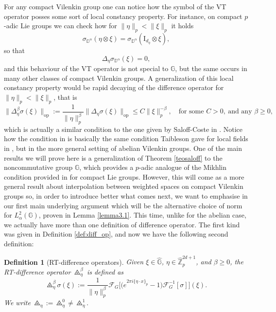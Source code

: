 \documentclass[12pt, reqno]{amsart}
\newtheorem{defi}{Definition}[section]
\newcommand{\1}{\mathds{1}}
\begin{document}
For any compact Vilenkin group one can notice how the symbol of the VT operator posses some sort of local constancy property. For instance, on compact $p$-adic Lie groups we can check how for $\|\eta\|_p < \|\xi\|_p$ it holds
\[
\sigma_{\mathbb{D}^\alpha} (\eta \otimes \xi) = \sigma_{\mathbb{D}^\alpha} ( \mathrm{I}_{d_\eta} \otimes \xi),
\]
so that
\[
\Delta_\eta \sigma_{\mathbb{D}^\alpha} (\xi) = 0,
\]
and this behaviour of the VT operator is not special to $\mathbb{G}$, but the same occurs in many other classes of compact Vilenkin groups. A generalization of this local constancy property would be rapid decaying of the difference operator for $\|\eta\|_p < \|\xi\|_p$, that is
\[
\|\Delta^\beta_\eta \sigma(\xi)\|_{\mathrm{op}} := \frac{1}{\|\eta\|_p^\beta}
\|\Delta_\eta \sigma(\xi)\|_{\mathrm{op}} \leq C \|\xi\|_p^{-\beta}, \quad \text{for some } C > 0, \ \text{and any } \beta \geq 0,
\]
which is actually a similar condition to the one given by Saloff-Coste in \cite{SaloffCoste1986}. Notice how the condition in \cite{SaloffCoste1986} is basically the same condition Taibleson gave for local fields in \cite{Taibleson1970}, but in the more general setting of abelian Vilenkin groups. One of the main results we will prove here is a generalization of Theorem \ref{teosaloff} to the noncommutative
group $\mathbb{G}$, which provides a $p$-adic analogue of the Mikhlin condition provided in \cite{Ruzhansky2015} for compact Lie groups. However, this will come as a more general result about interpolation between weighted
spaces on compact Vilenkin groups so, in order to introduce better what comes next, we want to
emphasise in our first main underlying argument which will be the alternative choice of norm for $L^2_\alpha(\mathbb{G})$, proven in Lemma \ref{lemma3.1}. This time, unlike for the abelian case, we actually have more than one definition of difference operator. The first kind was given in Definition \ref{def:diff_op}, and now we have the following second definition: 


\begin{defi}[RT-difference operators]\label{RT-difference operators}\normalfont
Given $\xi \in \widehat{\mathbb{G}}$, $\eta \in \widehat{\mathbb{Z}}_p^{2d+1}$, and $\beta \ge 0$, the \emph{RT-difference operator} $\triangletimes_\eta^\beta$ is defined as
\[
\triangletimes_\eta^\beta \sigma(\xi) := \frac{1}{\|\eta\|_p^\beta} \mathcal{F}_G \Big[ \big( e^{2 \pi i \{\eta \cdot x\}_p} - 1 \big) \mathcal{F}_G^{-1}[\sigma] \Big](\xi).
\]
We write $\triangletimes_{\eta} := \triangletimes^0_{\eta} \neq \triangletimes^1_{\eta}$.
\end{defi}
\end{document}
